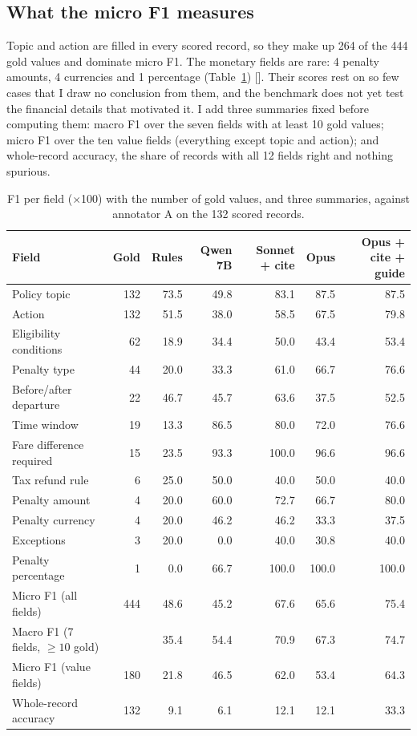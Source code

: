 \documentclass[11pt,a4paper]{article}
\newcommand{\res}[1]{{\small[\path{#1}]}}
\begin{document}
\subsection{What the micro F1 measures}\label{sec:fields}

Topic and action are filled in every scored record, so they make up 264 of the 444 gold values and dominate micro F1. The monetary fields are rare: 4 penalty amounts, 4 currencies and 1 percentage (Table~\ref{tab:fields}) \res{results/v1c_robustness.json}. Their scores rest on so few cases that I draw no conclusion from them, and the benchmark does not yet test the financial details that motivated it. I add three summaries fixed before computing them: macro F1 over the seven fields with at least 10 gold values; micro F1 over the ten value fields (everything except topic and action); and whole-record accuracy, the share of records with all 12 fields right and nothing spurious.

\begin{table}[h]
\centering
\footnotesize
\setlength{\tabcolsep}{4pt}
\begin{tabular}{lrrrrrr}
\toprule
Field & Gold & Rules & Qwen 7B & Sonnet + cite & Opus & Opus + cite + guide \\
\midrule
Policy topic & 132 & 73.5 & 49.8 & 83.1 & 87.5 & 87.5 \\
Action & 132 & 51.5 & 38.0 & 58.5 & 67.5 & 79.8 \\
Eligibility conditions & 62 & 18.9 & 34.4 & 50.0 & 43.4 & 53.4 \\
Penalty type & 44 & 20.0 & 33.3 & 61.0 & 66.7 & 76.6 \\
Before/after departure & 22 & 46.7 & 45.7 & 63.6 & 37.5 & 52.5 \\
Time window & 19 & 13.3 & 86.5 & 80.0 & 72.0 & 76.6 \\
Fare difference required & 15 & 23.5 & 93.3 & 100.0 & 96.6 & 96.6 \\
Tax refund rule & 6 & 25.0 & 50.0 & 40.0 & 50.0 & 40.0 \\
Penalty amount & 4 & 20.0 & 60.0 & 72.7 & 66.7 & 80.0 \\
Penalty currency & 4 & 20.0 & 46.2 & 46.2 & 33.3 & 37.5 \\
Exceptions & 3 & 20.0 & 0.0 & 40.0 & 30.8 & 40.0 \\
Penalty percentage & 1 & 0.0 & 66.7 & 100.0 & 100.0 & 100.0 \\
\midrule
Micro F1 (all fields) & 444 & 48.6 & 45.2 & 67.6 & 65.6 & 75.4 \\
Macro F1 (7 fields, $\geq 10$ gold) & & 35.4 & 54.4 & 70.9 & 67.3 & 74.7 \\
Micro F1 (value fields) & 180 & 21.8 & 46.5 & 62.0 & 53.4 & 64.3 \\
Whole-record accuracy & 132 & 9.1 & 6.1 & 12.1 & 12.1 & 33.3 \\
\bottomrule
\end{tabular}
\caption{F1 per field ($\times$100) with the number of gold values, and three summaries, against annotator A on the 132 scored records.}
\label{tab:fields}
\end{table}
\end{document}
